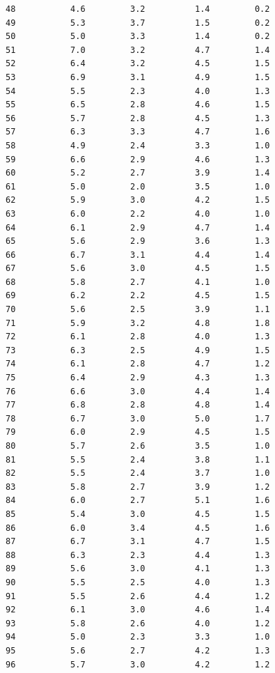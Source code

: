 \documentclass[
  a4paper,
]{ltjsbook}
\begin{document}
\begin{verbatim}
48           4.6         3.2          1.4         0.2
49           5.3         3.7          1.5         0.2
50           5.0         3.3          1.4         0.2
51           7.0         3.2          4.7         1.4
52           6.4         3.2          4.5         1.5
53           6.9         3.1          4.9         1.5
54           5.5         2.3          4.0         1.3
55           6.5         2.8          4.6         1.5
56           5.7         2.8          4.5         1.3
57           6.3         3.3          4.7         1.6
58           4.9         2.4          3.3         1.0
59           6.6         2.9          4.6         1.3
60           5.2         2.7          3.9         1.4
61           5.0         2.0          3.5         1.0
62           5.9         3.0          4.2         1.5
63           6.0         2.2          4.0         1.0
64           6.1         2.9          4.7         1.4
65           5.6         2.9          3.6         1.3
66           6.7         3.1          4.4         1.4
67           5.6         3.0          4.5         1.5
68           5.8         2.7          4.1         1.0
69           6.2         2.2          4.5         1.5
70           5.6         2.5          3.9         1.1
71           5.9         3.2          4.8         1.8
72           6.1         2.8          4.0         1.3
73           6.3         2.5          4.9         1.5
74           6.1         2.8          4.7         1.2
75           6.4         2.9          4.3         1.3
76           6.6         3.0          4.4         1.4
77           6.8         2.8          4.8         1.4
78           6.7         3.0          5.0         1.7
79           6.0         2.9          4.5         1.5
80           5.7         2.6          3.5         1.0
81           5.5         2.4          3.8         1.1
82           5.5         2.4          3.7         1.0
83           5.8         2.7          3.9         1.2
84           6.0         2.7          5.1         1.6
85           5.4         3.0          4.5         1.5
86           6.0         3.4          4.5         1.6
87           6.7         3.1          4.7         1.5
88           6.3         2.3          4.4         1.3
89           5.6         3.0          4.1         1.3
90           5.5         2.5          4.0         1.3
91           5.5         2.6          4.4         1.2
92           6.1         3.0          4.6         1.4
93           5.8         2.6          4.0         1.2
94           5.0         2.3          3.3         1.0
95           5.6         2.7          4.2         1.3
96           5.7         3.0          4.2         1.2

\end{verbatim}
\end{document}
